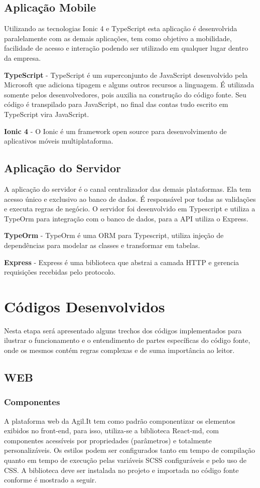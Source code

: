 \subsection{Aplicação Mobile}
Utilizando as tecnologias Ionic 4 e TypeScript esta aplicação é desenvolvida paralelamente com as demais aplicações, tem como objetivo a mobilidade, facilidade de acesso e interação podendo ser utilizado em qualquer lugar dentro da empresa.

{\textbf{TypeScript} - TypeScript é um superconjunto de JavaScript desenvolvido pela Microsoft que adiciona tipagem e alguns outros recursos a linguagem. É utilizada somente pelos desenvolvedores, pois auxilia na construção do código fonte. Seu código é transpilado para JavaScript, no final das contas tudo escrito em TypeScript vira JavaScript.}

{\textbf{Ionic 4} - O Ionic é um framework open source para desenvolvimento de aplicativos móveis multiplataforma.}

\subsection{Aplicação do Servidor}
A aplicação do servidor é o canal centralizador das demais plataformas. Ela tem acesso único e exclusivo ao banco de dados. É responsável por todas as validações e executa regras de negócio.
O servidor foi desenvolvido em Typescript e utiliza a TypeOrm para integração com o banco de dados, para a API utiliza o Express.

{\textbf{TypeOrm} - TypeOrm é uma ORM para Typescript, utiliza injeção de dependências para modelar as classes e transformar em tabelas.}

{\textbf{Express} - Express é uma biblioteca que abstrai a camada HTTP e gerencia requisições recebidas pelo protocolo.}


\section{Códigos Desenvolvidos} 

Nesta etapa será apresentado alguns trechos dos códigos implementados para ilustrar o funcionamento e o entendimento de partes específicas do código fonte, onde os mesmos contém regras complexas e de suma importância ao leitor.

\subsection{WEB}
\subsubsection{Componentes}
A plataforma web da Agil.It tem como padrão componentizar os elementos exibidos no front-end, para isso, utiliza-se a biblioteca React-md, com componentes acessíveis por propriedades (parâmetros) e totalmente personalizáveis. Os estilos podem ser configurados tanto em tempo de compilação quanto em tempo de execução pelas variáveis SCSS configuráveis e pelo uso de CSS.
A biblioteca deve ser instalada no projeto e importada no código fonte conforme é mostrado a seguir.

